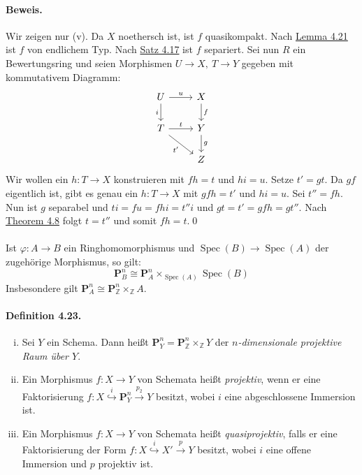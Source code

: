 \paragraph{Beweis.} Wir zeigen nur (v). Da $X$ noethersch ist, ist $f$ quasikompakt. Nach \hyperref[4.21]{Lemma 4.21} ist $f$ von endlichem Typ. Nach \hyperref[4.17]{Satz 4.17} ist $f$ separiert. Sei nun $R$ ein Bewertungsring und seien Morphismen $U\to X,\ T\to Y$ gegeben mit kommutativem Diagramm:
\[\begin{tikzcd}
U \ar[r, "u"]\ar[d, "i"']& X\ar[d, "f"]\\
T\ar[r, "t"]\ar[dr, "t'"'] & Y\ar[d, "g"]\\
& Z
\end{tikzcd} \]
Wir wollen ein $h:T\to X$ konstruieren mit $fh=t$ und $hi=u$. Setze $t'=gt$. Da $gf$ eigentlich ist, gibt es genau ein $h:T\to X$ mit $gfh=t'$ und $hi=u$. Sei $t''=fh$. Nun ist $g$ separabel und $ti=fu=fhi=t''i$ und $gt=t'=gfh=gt''$. Nach \hyperref[4.8]{Theorem 4.8} folgt $t=t''$ und somit $fh=t$.\qed

\paragraph{} Ist $\varphi:A\to B$ ein Ringhomomorphismus und $\operatorname{Spec}(B)\to\operatorname{Spec}(A)$ der zugehörige Morphismus, so gilt:
\[\mathbf{P}_B^n\cong\mathbf{P}_A^n\times_{\operatorname{Spec}(A)}\operatorname{Spec}(B) \]
Insbesondere gilt $\mathbf{P}_A^n\cong\mathbf{P}_\mathbb{Z}^n\times_\mathbb{Z}A$.

\paragraph{Definition 4.23.}\label{4.23} \begin{enumerate}[(i)]
\item Sei $Y$ ein Schema. Dann heißt $\mathbf{P}_Y^n=\mathbf{P}_\mathbb{Z}^n\times_\mathbb{Z}Y$ der \textit{$n$-dimensionale projektive Raum über $Y$}.
\item Ein Morphismus $f:X\to Y$ von Schemata heißt \textit{projektiv}, wenn er eine Faktorisierung $f:X\stackrel{i}{\hookrightarrow} \mathbf{P}_Y^n\stackrel{p_2}{\to} Y$ besitzt, wobei $i$ eine abgeschlossene Immersion ist.
\item Ein Morphismus $f:X\to Y$ von Schemata heißt \textit{quasiprojektiv}, falls er eine Faktorisierung der Form $f:X\stackrel{i}{\hookrightarrow} X'\stackrel{p}{\to}Y$ besitzt, wobei $i$ eine offene Immersion und $p$ projektiv ist.
\end{enumerate}

